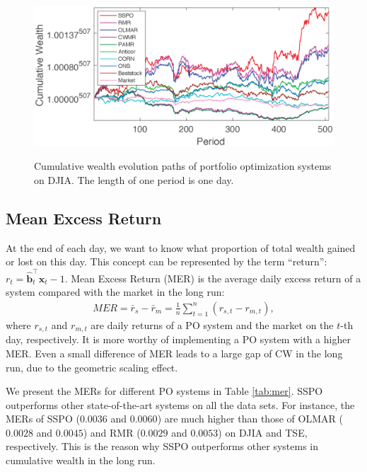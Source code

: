 \documentclass[twoside,11pt]{article}
\begin{document}
\begin{figure}[!htb]
\centering
\includegraphics[width=\textwidth]{./figure/cw-djia.eps}\\
\caption{Cumulative wealth evolution paths of portfolio optimization systems on DJIA. The length of one period is one day.}
\label{fig:cwplots}
\end{figure}





\subsection{Mean Excess Return}
\label{sec:MER}
At the end of each day, we want to know what proportion of total wealth gained or lost on this day. This concept can be represented by the term ``return'': $r_{t}=\hat{\mathbf{b}}_{t}^\top\mathbf{x}_t-1$. Mean Excess Return (MER) \citep{MR1} is the average daily excess return of a system compared with the market in the long run:
\begin{eqnarray}
\label{eqn:mer}
MER=\bar{r}_{s}-\bar{r}_{m}=\frac{1}{n}\sum_{t=1}^n ({r}_{s,t}-{r}_{m,t}),
\end{eqnarray}
where ${r}_{s,t}$ and ${r}_{m,t}$ are daily returns of a PO system and the market on the $t$-th day, respectively. It is more worthy of implementing a PO system with a higher MER. Even a small difference of MER leads to a large gap of CW in the long run, due to the geometric scaling effect.

We present the MERs for different PO systems in Table \ref{tab:mer}. SSPO outperforms other state-of-the-art systems on all the data sets. For instance, the MERs of SSPO ($0.0036$ and $0.0060$) are much higher than those of OLMAR ($0.0028$ and $0.0045$) and RMR ($0.0029$ and $0.0053$) on DJIA and TSE, respectively. This is the reason why SSPO outperforms other systems in cumulative wealth in the long run.
\end{document}
